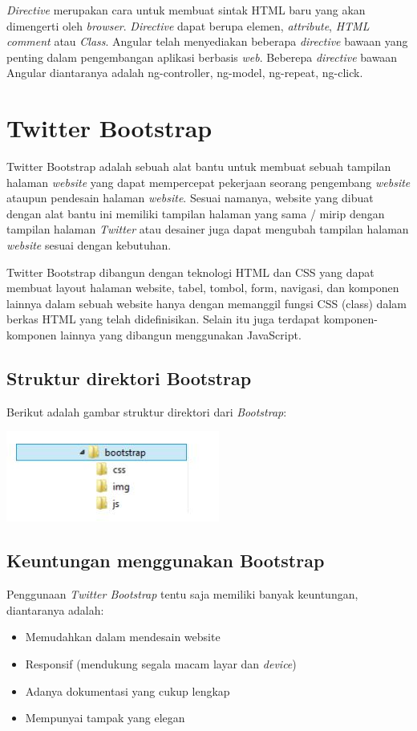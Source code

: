 	\textit{Directive} merupakan cara untuk membuat sintak HTML baru yang akan dimengerti oleh \textit{browser}. \textit{Directive} dapat berupa elemen, \textit{attribute}, \textit{HTML comment} atau \textit{Class}. Angular telah menyediakan beberapa \textit{directive} bawaan yang penting dalam pengembangan aplikasi berbasis \textit{web}. Beberepa \textit{directive} bawaan Angular diantaranya adalah ng-controller, ng-model, ng-repeat, ng-click.
	
\section{Twitter Bootstrap}
\label{sec: bootstrap}

	Twitter Bootstrap adalah sebuah alat bantu untuk membuat sebuah tampilan halaman \textit{website} yang dapat mempercepat pekerjaan seorang pengembang \textit{website} ataupun pendesain halaman \textit{website}. Sesuai namanya, website yang dibuat dengan alat bantu ini memiliki tampilan halaman yang sama / mirip dengan tampilan halaman \textit{Twitter} atau desainer juga dapat mengubah tampilan halaman \textit{website} sesuai dengan kebutuhan.

	Twitter Bootstrap dibangun dengan teknologi HTML dan CSS yang dapat	membuat layout halaman website, tabel, tombol, form, navigasi, dan komponen	lainnya dalam sebuah website hanya dengan memanggil fungsi CSS (class) dalam berkas HTML yang telah didefinisikan. Selain itu juga terdapat komponen-komponen lainnya yang dibangun menggunakan JavaScript.
	
	\subsection{Struktur direktori Bootstrap}
	\label{sub: struturDirektoriBootstrap}
	
	Berikut adalah gambar struktur direktori dari \textit{Bootstrap}:
	
	\includegraphics[scale= 1.0]{Gambar/strukturBootstrap}
	
	\subsection{Keuntungan menggunakan Bootstrap}
	\label{sub: keuntunganBootstrap}
	
	Penggunaan \textit{Twitter Bootstrap} tentu saja memiliki banyak keuntungan, diantaranya adalah:
	
	\begin{itemize}
		\item Memudahkan dalam mendesain website
		\item Responsif (mendukung segala macam layar dan \textit{device})
		\item Adanya dokumentasi yang cukup lengkap
		\item Mempunyai tampak yang elegan
	\end{itemize} 
	
	